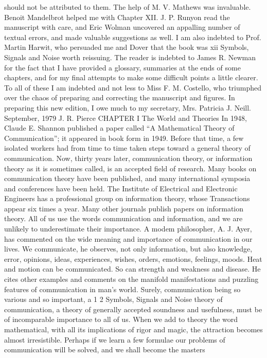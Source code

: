 should not be attributed to them. The help of M. V.
Mathews was invaluable. Benoit Mandelbrot helped me with
Chapter XII. J. P. Runyon read the manuscript with care, and Eric
Wolman uncovered an appalling number of textual errors, and
made valuable suggestions as well. I am also indebted to Prof.
Martin Harwit, who persuaded me and Dover that the book was
xii Symbols, Signals and Noise
worth reissuing. The reader is indebted to James R. Newman for
the fact that I have provided a glossary, summaries at the ends of
some chapters, and for my final attempts to make some difficult
points a little clearer. To all of these I am indebted and not less to
Miss F. M. Costello, who triumphed over the chaos of preparing
and correcting the manuscript and figures. In preparing this new
edition, I owe much to my secretary, Mrs. Patricia J. Neill.
September, 1979 J. R. Pierce
CHAPTER I The World and
Theories
In 1948, Claude E. Shannon published a paper called “A
Mathematical Theory of Communication”; it appeared in book
form in 1949. Before that time, a few isolated workers had from
time to time taken steps toward a general theory of communication.
Now, thirty years later, communication theory, or information
theory as it is sometimes called, is an accepted field of research.
Many books on communication theory have been published, and
many international symposia and conferences have been held.
The Institute of Electrical and Electronic Engineers has a professional
group on information theory, whose Transactions appear
six times a year. Many other journals publish papers on information
theory.
All of us use the words communication and information, and
we are unlikely to underestimate their importance. A modem
philosopher, A. J. Ayer, has commented on the wide meaning and
importance of communication in our lives. We communicate, he
observes, not only information, but also knowledge, error, opinions,
ideas, experiences, wishes, orders, emotions, feelings, moods. Heat
and motion can be communicated. So can strength and weakness
and disease. He cites other examples and comments on the manifold
manifestations and puzzling features of communication in
man’s world.
Surely, communication being so various and so important, a
1
2
Symbols, Signals and Noise
theory of communication, a theory of generally accepted soundness
and usefulness, must be of incomparable importance to all of us.
When we add to theory the word mathematical, with all its implications
of rigor and magic, the attraction becomes almost irresistible.
Perhaps if we learn a few formulae our problems of
communication will be solved, and we shall become the masters

